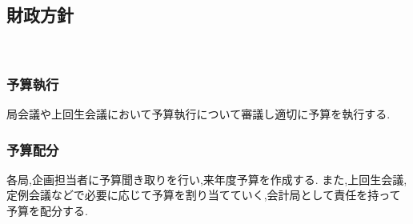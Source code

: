 \subsection*{財政方針}
​
​
\subsubsection*{予算執行}
局会議や上回生会議において予算執行について審議し適切に予算を執行する.
\subsubsection*{予算配分}
各局,企画担当者に予算聞き取りを行い,来年度予算を作成する. 
また,上回生会議,定例会議などで必要に応じて予算を割り当てていく,会計局として責任を持って予算を配分する.